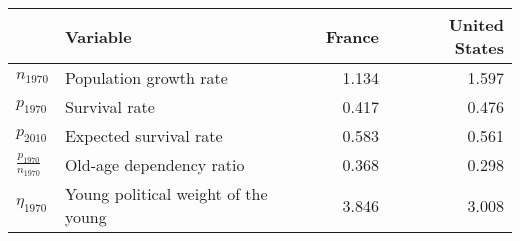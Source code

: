 
\begin{tabular}{llrr}
\toprule
\textbf{} & \textbf{Variable} & \textbf{France} & \textbf{United States}\\
\midrule
$n_{1970}$ & Population growth rate & 1.134 & 1.597\\
$p_{1970}$ & Survival rate & 0.417 & 0.476\\
$p_{2010}$ & Expected survival rate & 0.583 & 0.561\\
$\frac{p_{1970}}{n_{1970}}$ & Old-age dependency ratio & 0.368 & 0.298\\
$\eta_{1970}$ & Young political weight of the young & 3.846 & 3.008\\
\bottomrule
\end{tabular}
